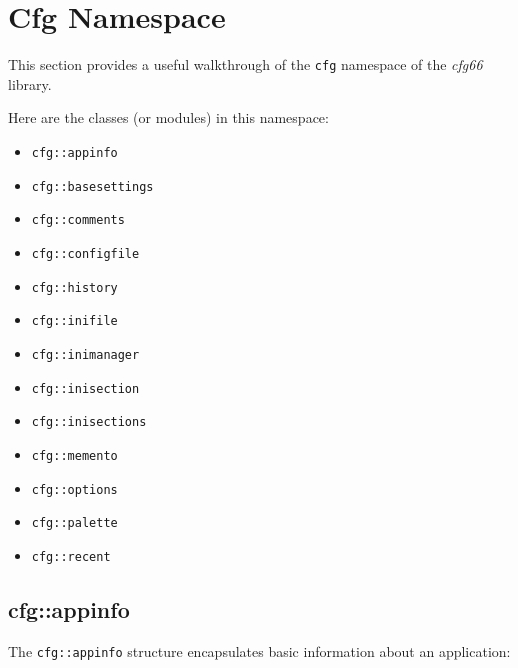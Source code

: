 %
%
%

\section{Cfg Namespace}
\label{sec:cfg_namespace}

   This section provides a useful walkthrough of the \texttt{cfg} namespace of
   the \textsl{cfg66} library.

   Here are the classes (or modules) in this namespace:

   \begin{itemize}
      \item \texttt{cfg::appinfo}
      \item \texttt{cfg::basesettings}
      \item \texttt{cfg::comments}
      \item \texttt{cfg::configfile}
      \item \texttt{cfg::history}
      \item \texttt{cfg::inifile}
      \item \texttt{cfg::inimanager}
      \item \texttt{cfg::inisection}
      \item \texttt{cfg::inisections}
      \item \texttt{cfg::memento}
      \item \texttt{cfg::options}
      \item \texttt{cfg::palette}
      \item \texttt{cfg::recent}
   \end{itemize}

\subsection{cfg::appinfo}
\label{subsec:cfg_namespace_appinfo}

   The \texttt{cfg::appinfo} structure encapsulates basic information about
   an application:


